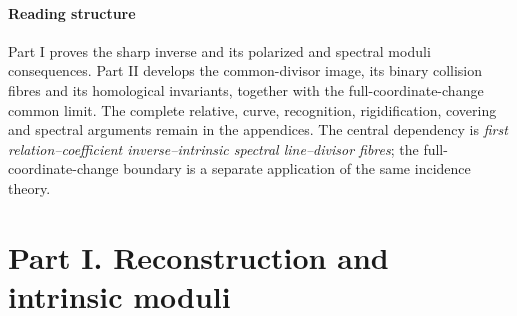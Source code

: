 \subsection{Reading structure}
Part I proves the sharp inverse and its polarized and spectral
moduli consequences. Part II develops the common-divisor image,
its binary collision fibres and its homological invariants, together
with the full-coordinate-change common limit. The complete relative,
curve, recognition, rigidification, covering and spectral arguments
remain in the appendices. The central dependency is
\emph{first relation--coefficient inverse--intrinsic spectral
line--divisor fibres}; the full-coordinate-change boundary is a
separate application of the same incidence theory.

\part*{Part I. Reconstruction and intrinsic moduli}
